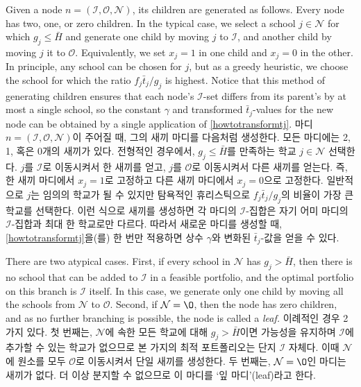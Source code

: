 \documentclass[11pt]{article} %
\theoremstyle{definition}
\theoremstyle{definition}
\begin{document}
\ifen 
Given a node $n  = (\mathcal{I}, \mathcal{O}, \mathcal{N})$, its children are generated as follows. Every node has two, one, or zero children. In the typical case, we select a school $j \in \mathcal{N}$ for which $g_j \leq \bar H$ and generate one child by moving $j$ to $\mathcal{I}$, and another child by moving $j$ it to $\mathcal{O}$. Equivalently, we set $x_j = 1$ in one child and $x_j = 0$ in the other. In principle, any school can be chosen for $j$, but as a greedy heuristic, we choose the school for which the ratio $f_j \bar t_j / g_j$ is highest. Notice that this method of generating children ensures that each node's $\mathcal{I}$-set differs from its parent's by at most a single school, so the constant $\gamma$ and transformed $\bar t_j$-values for the new node can be obtained by a single application of \eqref{howtotransformtj}. 
\else
마디  $n  = (\mathcal{I}, \mathcal{O}, \mathcal{N})$이 주어질 때, 그의 새끼 마디를 다음처럼 생성한다. 모든 마디에는 2, 1, 혹은 0개의 새끼가 있다. 전형적인 경우에서, $g_j \leq \bar H$를 만족하는 학교 $j \in \mathcal{N}$ 선택한다. $j$를 $\mathcal{I}$로 이동시켜서 한 새끼를 얻고, $j$를 $\mathcal{O}$로 이동시켜서 다른 새끼를 얻는다. 즉, 한 새끼 마디에서 $x_j = 1$로 고정하고 다른 새끼 마디에서 $x_j = 0$으로 고정한다. 일반적으로 $j$는 임의의 학교가 될 수 있지만 탐욕적인 휴리스틱으로 $f_j \bar t_j / g_j$의 비율이 가장 큰 학교를 선택한다. 이런 식으로 새끼를 생성하면 각 마디의 $\mathcal{I}$-집합은 자기 어미 마디의 $\mathcal{I}$-집합과 최대 한 학교로만 다르다. 따라서 새로운 마디를 생성할 때, \eqref{howtotransformtj}을(를) 한 번만 적용하면 상수 $\gamma$와 변화된 $\bar t_j$-값을 얻을 수 있다.
\fi

\ifen
There are two atypical cases. First, if every school in $\mathcal{N}$ has $g_j > \bar H$, then there is no school that can be added to $\mathcal{I}$ in a feasible portfolio, and the optimal portfolio on this branch is $\mathcal{I}$ itself. In this case, we generate only one child by moving all the schools from $\mathcal{N}$ to $\mathcal{O}$. Second, if $\mathcal{N} = \O$, then the node has zero children, and as no further branching is possible, the node is called a \emph{leaf.}
\else
이례적인 경우 2가지 있다. 첫 번째는, $\mathcal{N}$에 속한 모든 학교에 대해 $g_j > \bar H$이면 가능성을 유지하며 $\mathcal{I}$에 추가할 수 있는 학교가 없으므로 본 가지의 최적 포트폴리오는 단지 $\mathcal{I}$ 자체다. 이때 $\mathcal{N}$에 원소를 모두 $\mathcal{O}$로 이동시켜서 단일 새끼를 생성한다. 두 번째는, $\mathcal{N} = \O$인 마디는 새끼가 없다. 더 이상 분지할 수 없으므로 이 마디를 `잎 마디'(leaf)라고 한다.
\fi
\end{document}
